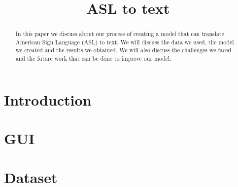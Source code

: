 \documentclass[conference]{IEEEtran}
\begin{document}
    \title{ASL to text\\}

    \author{
    \and
    \and
    }

    \maketitle

    \begin{abstract}
        In this paper we discuss about our process of creating a model that can translate American Sign Language (ASL) to text.
        We will discuss the data we used, the model we created and the results we obtained.
        We will also discuss the challenges we faced and the future work that can be done to improve our model.
    \end{abstract}


    \section{Introduction}\label{sec:introduction}
    

    \section{GUI}\label{sec:gui}
    

    \section{Dataset}\label{sec:dataset}
    
\end{document}
